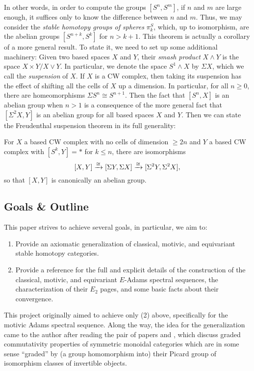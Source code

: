 \documentclass[../main.tex]{subfiles}
\begin{document}
In other words, in order to compute the groups $[S^n,S^m]$, if $n$ and $m$ are large enough, it suffices only to know the difference between $n$ and $m$. Thus, we may consider the \emph{stable homotopy groups of spheres} $\pi^S_k$, which, up to isomorphism, are the abelian groups $[S^{n+k},S^k]$ for $n>k+1$. This theorem is actually a corollary of a more general result. To state it, we need to set up some additional machinery: Given two based spaces $X$ and $Y$, their \emph{smash product} $X\wedge Y$ is the space $X\times Y/X\vee Y$. In particular, we denote the space $S^1\wedge X$ by $\Sigma X$, which we call the \emph{suspension} of $X$. If $X$ is a CW complex, then taking its suspension has the effect of shifting all the cells of $X$ up a dimension. In particular, for all $n\geq0$, there are homeomorphisms $\Sigma S^n\cong S^{n+1}$. Then the fact that $[S^n,X]$ is an abelian group when $n>1$ is a consequence of the more general fact that $[\Sigma^2X,Y]$ is an abelian group for all based spaces $X$ and $Y$. Then we can state the Freudenthal suspension theorem in its full generality:

\begin{theorem}
    For $X$ a based CW complex with no cells of dimension $\geq 2n$ and $Y$ a based CW complex with $[S^k,Y]=*$ for $k\leq n$, there are isomorphisms
    \[[X,Y]\xrightarrow\cong[\Sigma Y,\Sigma X]\xrightarrow\cong[\Sigma^2Y,\Sigma^2X],\]
    so that $[X,Y]$ is canonically an abelian group.
\end{theorem}


\subsection{Goals \& Outline}

This paper strives to achieve several goals, in particular, we aim to:
\begin{enumerate}
    \item Provide an axiomatic generalization of classical, motivic, and equivariant stable homotopy categories.
    \item Provide a reference for the full and explicit details of the construction of the classical, motivic, and equivariant $E$-Adams spectral sequences, the characterization of their $E_2$ pages, and some basic facts about their convergence.
\end{enumerate}
This project originally aimed to achieve only (2) above, specifically for the motivic Adams spectral sequence. Along the way, the idea for the generalization came to the author after reading the pair of papers \cite{Dugger_2014} and \cite{DDIO}, which discuss graded commutativity properties of symmetric monoidal categories which are in some sense ``graded'' by (a group homomorphism into) their Picard group of isomorphism classes of invertible objects.
\end{document}
